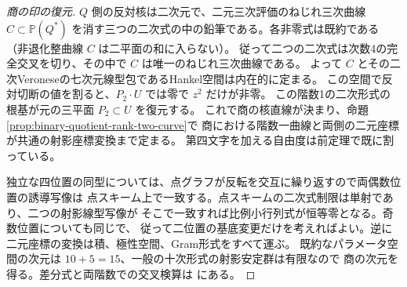 \begin{proof}[商の印の復元]
$Q$ 側の反対核は二次元で、二元三次評価のねじれ三次曲線 $C\subset\mathbb P(Q^*)$
を消す三つの二次式の中の鉛筆である。各非零式は既約である
（非退化整曲線 $C$ は二平面の和に入らない）。
従って二つの二次式は次数4の完全交叉を切り、その中で $C$ は唯一のねじれ三次曲線である。
よって $C$ とその二次Veroneseの七次元線型包であるHankel空間は内在的に定まる。
この空間で反対切断の値を割ると、$P_2\cdot U$ では零で $z^2$ だけが非零。
この階数1の二次形式の根基が元の三平面 $P_2\subset U$ を復元する。
これで商の核直線が決まり、命題\ref{prop:binary-quotient-rank-two-curve}で
商における階数一曲線と両側の二元座標が共通の射影座標変換まで定まる。
第四文字を加える自由度は前定理で既に割っている。

独立な四位置の同型については、点グラフが反転を交互に繰り返すので両偶数位置の誘導写像は
点スキーム上で一致する。点スキームの二次式制限は単射であり、二つの射影線型写像が
そこで一致すれば比例小行列式が恒等零となる。奇数位置についても同じで、
従って二位置の基底変更だけを考えればよい。逆に二元座標の変換は積、極性空間、Gram形式をすべて運ぶ。
既約なパラメータ空間の次元は $10+5=15$、一般の十次形式の射影安定群は有限なので
商の次元を得る。差分式と両階数での交叉検算は
にある。
\end{proof}
